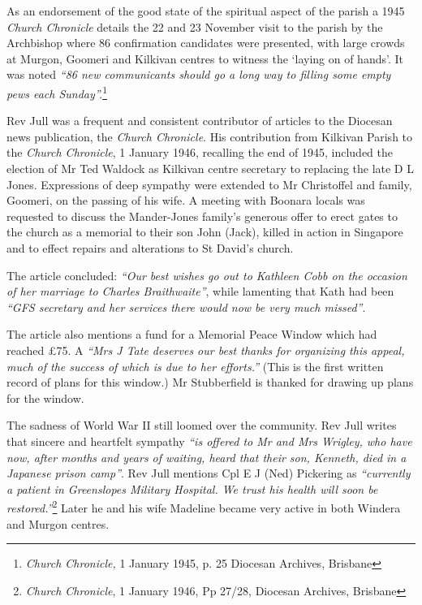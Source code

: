 As an endorsement of the good state of the spiritual aspect of the parish a 1945 \emph{Church Chronicle} details the 22 and 23 November visit to the parish by the Archbishop where 86 confirmation candidates were presented, with large crowds at Murgon, Goomeri and Kilkivan centres to witness the `laying on of hands'. It was noted \emph{``86 new communicants should go a long way to filling some empty pews each Sunday''.}\footnote{\emph{Church Chronicle,} 1 January 1945, p. 25 Diocesan Archives, Brisbane}


Rev Jull was a frequent and consistent contributor of articles to the Diocesan news publication, the \emph{Church Chronicle}. His contribution from Kilkivan Parish to the \emph{Church Chronicle}, 1 January 1946, recalling the end of 1945, included the election of Mr Ted Waldock as Kilkivan centre secretary to replacing the late D L Jones. Expressions of deep sympathy were extended to Mr Christoffel and family, Goomeri, on the passing of his wife. A meeting with Boonara locals was requested to discuss the Mander-Jones family's generous offer to erect gates to the church as a memorial to their son John (Jack), killed in action in Singapore and to effect repairs and alterations to St David's church.



The article concluded: \emph{``Our best wishes go out to Kathleen Cobb on the occasion of her marriage to Charles Braithwaite''}, while lamenting that Kath had been \emph{``GFS secretary and her services there would now be very much missed''}.



The article also mentions a fund for a Memorial Peace Window which had reached \pounds75. A \emph{``Mrs J Tate deserves our best thanks for organizing this appeal, much of the success of which is due to her efforts.''} (This is the first written record of plans for this window.) Mr Stubberfield is thanked for drawing up plans for the window.



The sadness of World War II still loomed over the community. Rev Jull writes that sincere and heartfelt sympathy \emph{``is offered to Mr and Mrs Wrigley, who have now, after months and years of waiting, heard that their son, Kenneth, died in a Japanese prison camp''}. Rev Jull mentions Cpl E J (Ned) Pickering as \emph{``currently a patient in Greenslopes Military Hospital. We trust his health will soon be restored.''}\footnote{\emph{Church Chronicle}, 1 January 1946, Pp 27/28, Diocesan Archives, Brisbane} Later he and his wife Madeline became very active in both Windera and Murgon centres.


